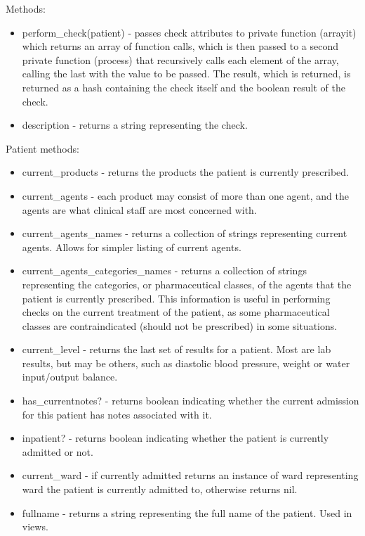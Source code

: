 \documentclass[letterpaper]{amsart}
\begin{document}
Methods:
\begin{itemize}
    \item perform\_check(patient) - passes check attributes to private function (arrayit) which returns an array of function calls, which is then passed to a second private function (process) that recursively calls each element of the array, calling the last with the value to be passed.  The result, which is returned, is returned as a hash containing the check itself and the boolean result of the check. 
    \item description - returns a string representing the check.
\end{itemize}

Patient methods:

\begin{itemize}
    \item current\_products - returns the products the patient is currently prescribed. 
    \item current\_agents  - each product may consist of more than one agent, and the agents are what clinical staff are most concerned with.
    \item current\_agents\_names - returns a collection of strings representing current agents.  Allows for simpler listing of current agents. 
    \item current\_agents\_categories\_names - returns a collection of strings representing the categories, or pharmaceutical classes, of the agents that the patient is currently prescribed.  This information is useful in performing checks on the current treatment of the patient, as some pharmaceutical classes are contraindicated (should not be prescribed) in some situations. 
    \item current\_level - returns the last set of results for a patient.  Most are lab results, but may be others, such as diastolic blood pressure, weight or water input/output balance. 
    \item has\_currentnotes? - returns boolean indicating whether the current admission for this patient has notes associated with it. 
    \item inpatient? - returns boolean indicating whether the patient is currently admitted or not. 
    \item current\_ward - if currently admitted returns an instance of ward representing ward the patient is currently admitted to, otherwise returns nil. 
    \item fullname - returns a string representing the full name of the patient.  Used in views. 

\end{itemize}
\end{document}
